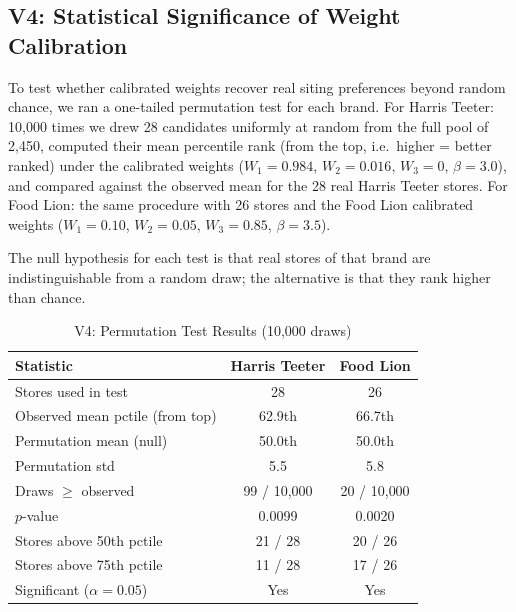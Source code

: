 \documentclass[conference]{IEEEtran}
\begin{document}
\subsection{V4: Statistical Significance of Weight Calibration}
\label{sec:v4}

To test whether calibrated weights recover real siting preferences
beyond random chance, we ran a one-tailed permutation test for each
brand. For Harris Teeter: 10{,}000 times we drew 28 candidates
uniformly at random from the full pool of 2{,}450, computed their
mean percentile rank (from the top, i.e.\ higher = better ranked)
under the calibrated weights ($W_1=0.984$, $W_2=0.016$, $W_3=0$,
$\beta=3.0$), and compared against the observed mean for the 28 real
Harris Teeter stores. For Food Lion: the same procedure with 26
stores and the Food Lion calibrated weights ($W_1=0.10$, $W_2=0.05$,
$W_3=0.85$, $\beta=3.5$).

The null hypothesis for each test is that real stores of that brand
are indistinguishable from a random draw; the alternative is that
they rank higher than chance.

\begin{table}[!t]
\centering
\caption{V4: Permutation Test Results (10{,}000 draws)}
\label{tab:v4_permutation}
\begin{tabular}{lcc}
\toprule
\textbf{Statistic} & \textbf{Harris Teeter} & \textbf{Food Lion} \\
\midrule
Stores used in test             & 28         & 26     \\
Observed mean pctile (from top) & 62.9th     & 66.7th \\
Permutation mean (null)         & 50.0th     & 50.0th \\
Permutation std                 & 5.5        & 5.8    \\
Draws $\geq$ observed           & 99 / 10{,}000 & 20 / 10{,}000 \\
$p$-value                       & 0.0099     & 0.0020 \\
Stores above 50th pctile        & 21 / 28    & 20 / 26 \\
Stores above 75th pctile        & 11 / 28    & 17 / 26 \\
Significant ($\alpha = 0.05$)   & Yes        & Yes    \\
\bottomrule
\end{tabular}
\end{table}
\end{document}
